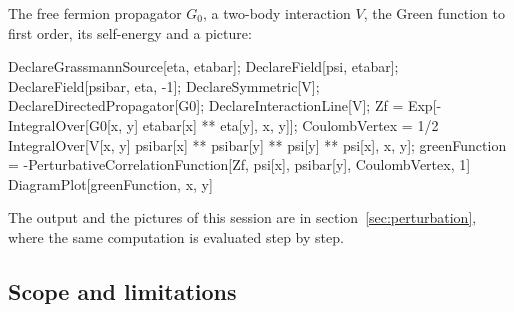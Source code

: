 \documentclass[11pt,a4paper]{article}
\begin{document}
The free fermion propagator $G_0$, a two-body interaction $V$, the Green function to first order, its self-energy and a
picture:
\begin{code}
DeclareGrassmannSource[eta, etabar];
DeclareField[psi, etabar]; DeclareField[psibar, eta, -1];
DeclareSymmetric[V]; DeclareDirectedPropagator[G0]; DeclareInteractionLine[V];
Zf = Exp[-IntegralOver[G0[x, y] etabar[x] ** eta[y], {x, y}]];
CoulombVertex = 1/2 IntegralOver[V[x, y] psibar[x] ** psibar[y] ** psi[y] ** psi[x], {x, y}];
greenFunction = -PerturbativeCorrelationFunction[Zf, {psi[x], psibar[y]}, CoulombVertex, 1]
DiagramPlot[greenFunction, {x, y}]
\end{code}
The output and the pictures of this session are in section~\ref{sec:perturbation}, where the same computation is
evaluated step by step.

\subsection{Scope and limitations}
\end{document}
